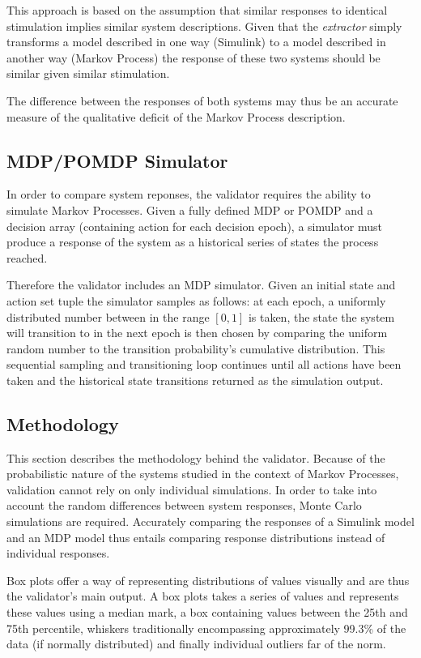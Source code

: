 This approach is based on the assumption that similar responses to identical stimulation implies similar system descriptions. Given that the \textit{extractor} simply transforms a model described in one way (Simulink) to a model described in another way (Markov Process) the response of these two systems should be similar given similar stimulation.

The difference between the responses of both systems may thus be an accurate measure of the qualitative deficit of the Markov Process description.

\subsection{MDP/POMDP Simulator}

In order to compare system reponses, the validator requires the ability to simulate Markov Processes. Given a fully defined MDP or POMDP and a decision array (containing action for each decision epoch), a simulator must produce a response of the system as a historical series of states the process reached.

Therefore the validator includes an MDP simulator. Given an initial state and action set tuple the simulator samples as follows: at each epoch, a uniformly distributed number between in the range $[0,1]$ is taken, the state the system will transition to in the next epoch is then chosen by comparing the uniform random number to the transition probability's cumulative distribution. This sequential sampling and transitioning loop continues until all actions have been taken and the historical state transitions returned as the simulation output.

\subsection{Methodology}
\label{subsec:validationmethodology}

This section describes the methodology behind the validator. Because of the probabilistic nature of the systems studied in the context of Markov Processes, validation cannot rely on only individual simulations. In order to take into account the random differences between system responses, Monte Carlo simulations are required. Accurately comparing the responses of a Simulink model and an MDP model thus entails comparing response distributions instead of individual responses.

Box plots offer a way of representing distributions of values visually and are thus the validator's main output. A box plots takes a series of values and represents these values using a median mark, a box containing values between the 25th and 75th percentile, whiskers traditionally encompassing approximately 99.3\% of the data (if normally distributed) and finally individual outliers far of the norm.

